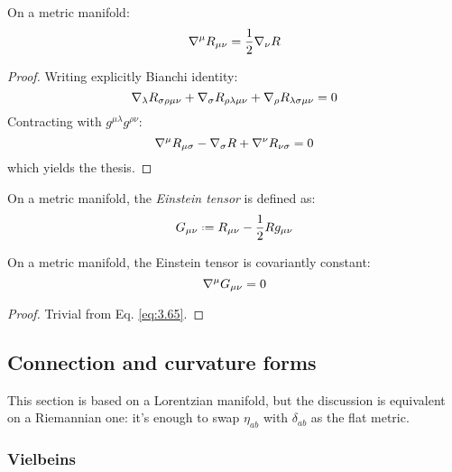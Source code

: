 \begin{proposition}
  On a metric manifold:
  \begin{equation}
    \nabla^\mu R_{\mu \nu} = \frac{1}{2} \nabla_\nu R
    \label{eq:3.65}
  \end{equation}
\end{proposition}
\begin{proof}
  Writing explicitly Bianchi identity:
  \begin{equation*}
    \nabla_\lambda R_{\sigma \rho \mu \nu} + \nabla_\sigma R_{\rho \lambda \mu \nu} + \nabla_\rho R_{\lambda \sigma \mu \nu} = 0
  \end{equation*}
  Contracting with $ g^{\mu \lambda} g^{\rho \nu} $:
  \begin{equation*}
    \nabla^\mu R_{\mu \sigma} - \nabla_\sigma R + \nabla^\nu R_{\nu \sigma} = 0
  \end{equation*}
  which yields the thesis.
\end{proof}

\begin{definition}
  On a metric manifold, the \textit{Einstein tensor} is defined as:
  \begin{equation}
    G_{\mu \nu} \defeq R_{\mu \nu} - \frac{1}{2} R g_{\mu \nu}
    \label{eq:3.66}
  \end{equation}
\end{definition}

\begin{proposition}
  On a metric manifold, the Einstein tensor is covariantly constant:
  \begin{equation}
    \nabla^\mu G_{\mu \nu} = 0
    \label{eq:3.67}
  \end{equation}
\end{proposition}
\begin{proof}
  Trivial from Eq. \ref{eq:3.65}.
\end{proof}

\subsection{Connection and curvature forms}

This section is based on a Lorentzian manifold, but the discussion is equivalent on a Riemannian one: it's enough to swap $ \eta_{ab} $ with $ \delta_{ab} $ as the flat metric.

\subsubsection{Vielbeins}

